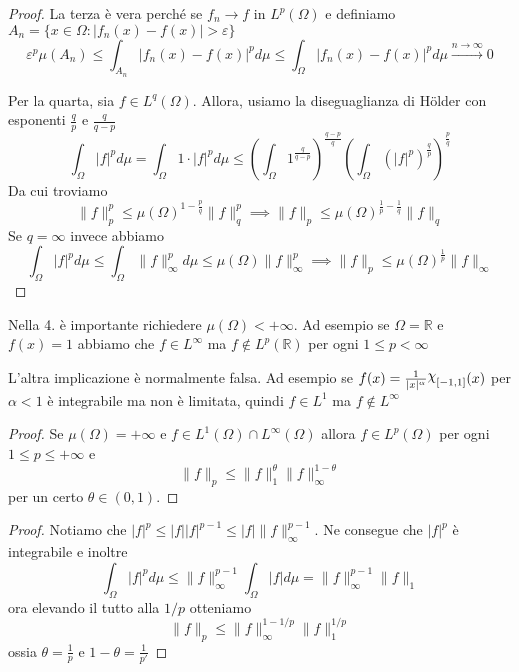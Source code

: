 \begin{proof}
La terza è vera perché se \(f_{n} \to
f\) in \(L^{p}{(\Omega)}\) e definiamo \(A_{n} = \{x \in \Omega : \left|
f_{n}{(x)}-f{(x)} \right| > \varepsilon\} \) 
\[
    \varepsilon^{p} \mu(A_{n}) \le \int_{A_{n}} \left| f_{n}{(x)} - f{(x)}
    \right|^{p} d\mu \le \int_{\Omega} \left| f_{n}{(x)} - f{(x)} \right|^{p}
    d\mu \overset{n \to \infty}{\longrightarrow} 0
\]

    Per la quarta, sia \(f \in L^{q}{(\Omega)}\). Allora, usiamo la
    diseguaglianza di Hölder con esponenti \(\frac{q}{p}\) e \(\frac{q}{q-p}\) 
    \[
        \int_{\Omega} \left| f \right|^{p} d\mu = \int_{\Omega} 1 \cdot
        |f|^{p}d\mu \le {\left( \int_{\Omega} 1^{\frac{q}{q-p}}
        \right)}^{\frac{q-p}{q}} {\left( \int_{\Omega} {\left( |f|^{p}
        \right)}^{\frac{q}{p}}  \right)}^{\frac{p}{q}}
    \]
    Da cui troviamo 
    \[
    \|f\|_p^{p} \le {\mu(\Omega)}^{1 - \frac{p}{q}} \|f\|_q^{p} \implies
    \|f\|_p \le {\mu(\Omega)}^{\frac{1}{p} - \frac{1}{q}} \|f\|_q
    \]
    Se \(q = \infty\) invece abbiamo 
    \[
        \int_\Omega |f|^{p} d\mu \le \int_{\Omega} \|f\|^{p}_{\infty} d\mu \le
        \mu(\Omega) \|f\|_{\infty}^{p} \implies \|f\|_p \le
        {\mu(\Omega)}^{\frac{1}{p}} \|f\|_{\infty}
    \]
\end{proof}
\begin{example}
    Nella 4. è importante richiedere \(\mu{(\Omega )} < +\infty\). Ad esempio se
    \(\Omega = \mathbb{R}\) e \(f{(x)} = 1\) abbiamo che \(f \in L^{\infty}\) ma
    \(f \not\in L^{p}{(\mathbb{R})}\) per ogni \(1 \le p < \infty\) 
\end{example}
\begin{example}
    L'altra implicazione è normalmente falsa. Ad esempio se \(f{(x)} =
    \frac{1}{|x|^{\alpha}} \rchi_{[-1,1]}{(x)} \) per \(\alpha < 1\) è
    integrabile ma non è limitata, quindi \(f \in L^{1}\) ma \(f\not\in L^{\infty}\) 
\end{example}
\begin{proof}
    Se \(\mu{(\Omega)} = +\infty\) e \(f \in L^{1}{(\Omega)} \cap
    L^{\infty}{(\Omega)}\) allora \(f \in L^{p}{(\Omega)}\) per ogni \(1 \le p
    \le +\infty\) e
    \[
        \|f\|_p \le \|f\|_1^{\theta} \|f\|_{\infty}^{1-\theta} 
    \]
    per un certo \(\theta \in {(0,1)}\).
\end{proof}
\begin{proof}
    Notiamo che \(|f|^{p} \le |f||f|^{p-1} \le |f| \|f\|_\infty^{p-1}\). Ne
    consegue che \(|f|^{p }\) è integrabile e inoltre
    \[
        \int_\Omega |f|^{p} d\mu \le \|f\|_\infty^{p-1} \int_\Omega |f| d\mu =
        \|f\|_\infty^{p-1} \|f\|_1
    \]
    ora elevando il tutto alla \(1/p\) otteniamo
    \[
        \|f\|_p \le \|f\|_\infty^{1-1/p} \|f\|_1^{1/p}
    \]
    ossia \(\displaystyle \theta = \frac{1}{p}\) e \(\displaystyle 1 - \theta = \frac{1}{p'}\) 
\end{proof}
